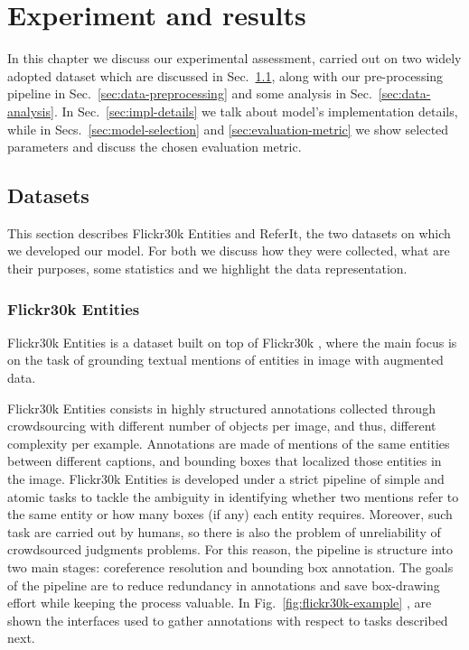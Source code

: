 
\chapter{Experiment and results}
\label{ch:experiments}

In this chapter we discuss our experimental assessment, carried out on
two widely adopted dataset which are discussed in
Sec.~\ref{sec:datasets}, along with our pre-processing pipeline in
Sec.~\ref{sec:data-preprocessing} and some analysis in
Sec.~\ref{sec:data-analysis}. In Sec.~\ref{sec:impl-details} we talk
about model's implementation details, while in
Secs.~\ref{sec:model-selection} and \ref{sec:evaluation-metric} we
show selected parameters and discuss the chosen evaluation metric.

\section{Datasets}
\label{sec:datasets}

This section describes Flickr30k Entities and ReferIt, the two
datasets on which we developed our model. For both we discuss how they
were collected, what are their purposes, some statistics and we
highlight the data representation.

\subsection{Flickr30k Entities}
\label{subsec:flickr30k}

Flickr30k Entities \cite{plummer2015flickr30k} is a dataset built on
top of Flickr30k \cite{young2014image}, where the main focus is on the
task of grounding textual mentions of entities in image with augmented
data.

Flickr30k Entities consists in highly structured annotations collected
through crowdsourcing with different number of objects per image, and
thus, different complexity per example. Annotations are made of
mentions of the same entities between different captions, and bounding
boxes that localized those entities in the image. Flickr30k Entities
is developed under a strict pipeline of simple and atomic tasks to
tackle the ambiguity in identifying whether two mentions refer to the
same entity or how many boxes (if any) each entity requires. Moreover,
such task are carried out by humans, so there is also the problem of
unreliability of crowdsourced judgments problems. For this reason, the
pipeline is structure into two main stages: coreference resolution and
bounding box annotation. The goals of the pipeline are to reduce
redundancy in annotations and save box-drawing effort while keeping
the process valuable. In Fig.~\ref{fig:flickr30k-example}
\cite{plummer2015flickr30k}, are shown the interfaces used to gather
annotations with respect to tasks described next.

